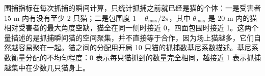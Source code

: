围捕指标在每次抓捕的瞬间计算，只统计抓捕之前就已经是猫的个体：一是受害者 15 m 内有没有至少 2 只猫；二是包围度 $1-\theta_{\max}/2\pi$，其中 $\theta_{\max}$ 是 20 m 内的猫相对受害者的最大角度空缺，猫全在同一侧时接近 0，四面包围时接近 1。这两个量描述的是抓捕瞬间猫的空间聚集，并不直接等于合作，因为场上猫越多，它们自然越容易聚在一起。猫之间的分配用开局 10 只猫的抓捕数基尼系数描述。基尼系数衡量分配的不均匀程度：0 表示每只猫抓到的数量完全相同，越接近 1 表示抓捕越集中在少数几只猫身上。
